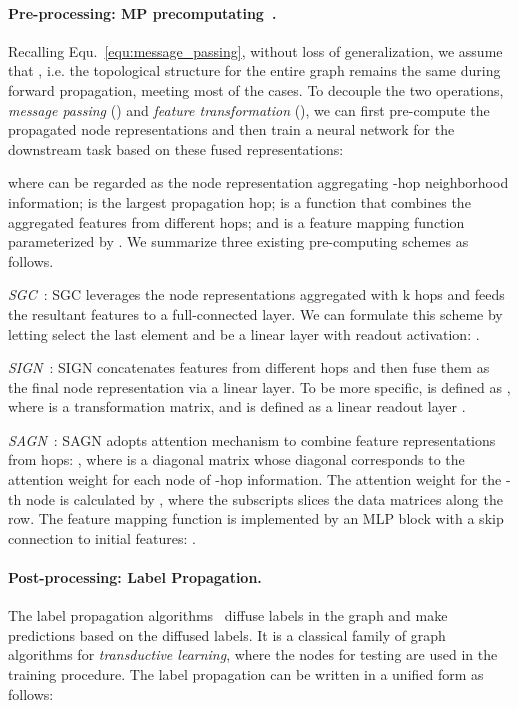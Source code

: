 \message{ !name(main.tex)}\documentclass{article}
\begin{document}
\vspace{-2mm}
\paragraph{Pre-processing: MP precomputating~\cite{wu2019simplifying,frasca2020sign,sun2021scalable}.} Recalling Equ.~\eqref{equ:message_passing}, without loss of generalization, we assume that , i.e. the topological structure for the entire graph remains the same during forward propagation, meeting most of the cases. To decouple the two operations, \textit{message passing} () and \textit{feature transformation} (), we can first pre-compute the propagated node representations and then train a neural network for the downstream task based on these fused representations:

where  can be regarded as the node representation aggregating -hop neighborhood information;  is the largest propagation hop;  is a function that combines the aggregated features from different hops; and  is a feature mapping function parameterized by . We summarize three existing pre-computing schemes as follows.

 \textit{SGC}~\cite{wu2019simplifying}: SGC leverages the node representations aggregated with k hops and feeds the resultant features to a full-connected layer. We can formulate this scheme by letting  select the last element  and  be a linear layer with readout activation: .

\noindent
 \textit{SIGN}~\cite{frasca2020sign}: SIGN concatenates features from different hops and then fuse them as the final node representation via a linear layer. To be more specific,  is defined as , where  is a transformation matrix, and  is defined as a linear readout layer .

\noindent
 \textit{SAGN}~\cite{sun2021scalable}: SAGN adopts attention mechanism to combine feature representations from  hops: , where  is a diagonal matrix whose diagonal corresponds to the attention weight for each node of -hop information. The attention weight for the -th node is calculated by , where the subscripts slices the data matrices along the row.
The feature mapping function is implemented by an MLP block with a skip connection to initial features: .


\vspace{-2mm}
\paragraph{Post-processing: Label Propagation.}
The label propagation algorithms~\citep{zhu2005semi, wang2007label, karasuyama2013manifold, gong2016label, liu2018learning, huang2020combining, wang2020unifying} diffuse labels in the graph and make predictions based on the diffused labels. It is a classical family of graph algorithms for \textit{transductive learning}, where the nodes for testing are used in the training procedure. The label propagation can be written in a unified form as follows:
\end{document}

